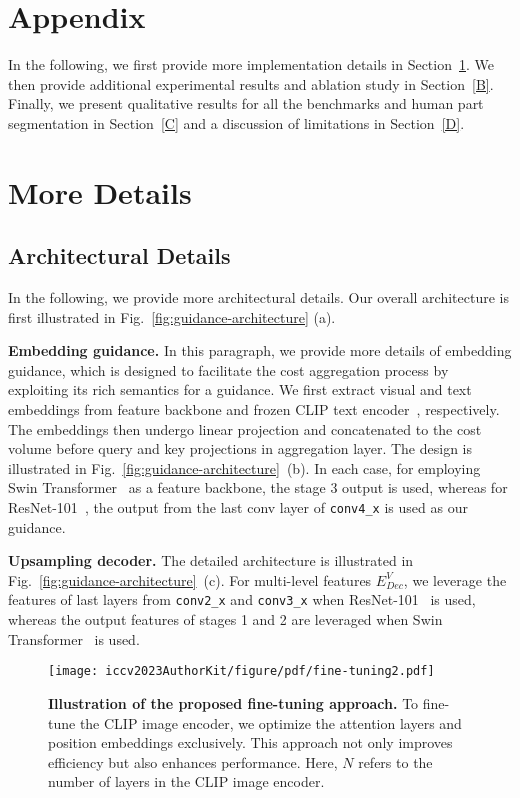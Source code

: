 \documentclass[10pt,twocolumn,letterpaper]{article}
\begin{document}
\section*{Appendix}
In the following, we first provide more implementation details in Section~\ref{A}. We then provide additional experimental results and ablation study in Section~\ref{B}. Finally, we present qualitative results for all the benchmarks and human part segmentation in Section~\ref{C} and a discussion of limitations in Section~\ref{D}.


\section{More Details}\label{A}
\subsection{Architectural Details}

In the following, we provide more architectural details. Our overall architecture is first illustrated in Fig.~\ref{fig:guidance-architecture} (a).

\smallbreak
\noindent\textbf{Embedding guidance.}
In this paragraph, we provide more details of embedding guidance, which is designed to facilitate the cost aggregation process by exploiting its rich semantics for a guidance.  We first extract visual and text embeddings from feature backbone and frozen CLIP text encoder~\cite{radford2021learning}, respectively. The embeddings then undergo linear projection and concatenated to the cost volume before query and key projections in aggregation layer. The design is illustrated in Fig.~\ref{fig:guidance-architecture}~(b). In each case, for employing Swin Transformer~\cite{liu2021swin} as a feature backbone, the stage 3 output is used, whereas for ResNet-101~\cite{he2016deep}, the output from the last conv layer of \texttt{conv4\_x} is used as our guidance.

\smallbreak
\noindent\textbf{Upsampling decoder.}
The detailed architecture is illustrated in Fig.~\ref{fig:guidance-architecture}~(c). For multi-level features $E^V_{Dec}$, we leverage the features of last layers from \texttt{conv2\_x} and \texttt{conv3\_x} when ResNet-101~\cite{he2016deep} is used, whereas the output features of stages 1 and 2 are leveraged when Swin Transformer~\cite{liu2021swin} is used. 





\begin{figure}[t]
    \centering
    \texttt{[image: iccv2023AuthorKit/figure/pdf/fine-tuning2.pdf]}\hfill\\
    \vspace{-5pt}
    \caption{\textbf{Illustration of the proposed fine-tuning approach.} To fine-tune the CLIP image encoder, we optimize the attention layers and position embeddings exclusively. This approach not only improves efficiency but also enhances performance. Here, $N$ refers to the number of layers in the CLIP image encoder.}
    \label{fig:fine-tune}\vspace{-5pt}
\end{figure} 
\end{document}
